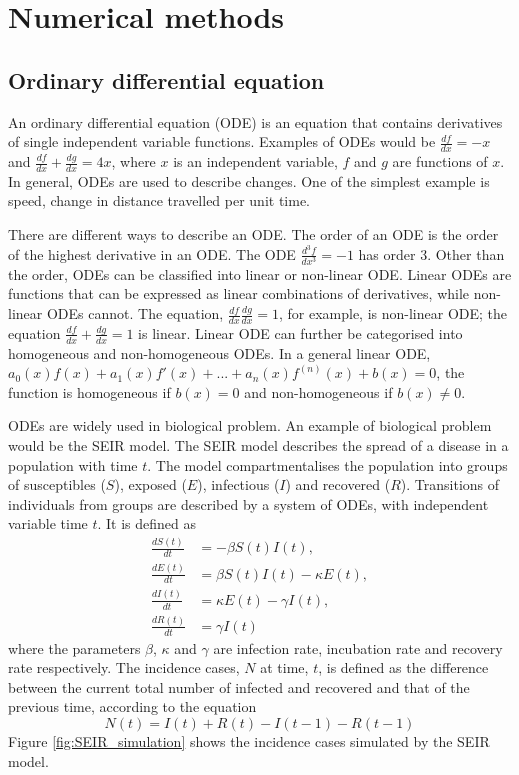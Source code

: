 \chapter{Numerical methods}
\label{chap:numerical-methods}
\section{Ordinary differential equation}
An ordinary differential equation (ODE) is an equation that contains derivatives of single independent variable functions. Examples of ODEs would be $\frac{df}{dx}=-x$ and $\frac{df}{dx} + \frac{dg}{dx} = 4x$, where $x$ is an independent variable, $f$ and $g$ are functions of $x$. In general, ODEs are used to describe changes. One of the simplest example is speed, change in distance travelled per unit time. 

There are different ways to describe an ODE. The order of an ODE is the order of the highest derivative in an ODE. The ODE $\frac{d^3f}{dx^3} = -1$ has order 3. Other than the order, ODEs can be classified into linear or non-linear ODE. Linear ODEs are functions that can be expressed as linear combinations of derivatives, while non-linear ODEs cannot. The equation, $\frac{df}{dx} \frac{dg}{dx} = 1$, for example, is non-linear ODE; the equation $\frac{df}{dx} + \frac{dg}{dx} = 1$ is linear. Linear ODE can further be categorised into homogeneous and non-homogeneous ODEs. In a general linear ODE, $a_0(x)f(x)+a_1(x)f'(x)+...+a_n(x)f^{(n)}(x)+b(x) = 0$, the function is homogeneous if $b(x) = 0$ and non-homogeneous if $b(x) \neq 0$.

ODEs are widely used in biological problem. An example of biological problem would be the SEIR model. The SEIR model describes the spread of a disease in a population with time $t$. The model compartmentalises the population into groups of susceptibles ($S$), exposed ($E$), infectious ($I$) and recovered ($R$). Transitions of individuals from groups are described by a system of ODEs, with independent variable time $t$. It is defined as 
\begin{align}
\label{eqn:SEIR-model}
    \frac{dS(t)}{dt} &= -\beta S(t)I(t),  \\ 
    \frac{dE(t)}{dt} &= \beta S(t)I(t) - \kappa E(t), \\
    \frac{dI(t)}{dt} &= \kappa E(t) - \gamma I(t), \\
    \frac{dR(t)}{dt} &= \gamma I(t) \label{eqn:SEIR-end}
\end{align}
where the parameters $\beta$, $\kappa$ and $\gamma$ are infection rate, incubation rate and recovery rate respectively. The incidence cases, $N$ at time, $t$, is defined as the difference between the current total number of infected and recovered and that of the previous time, according to the equation
\begin{equation}
    N(t) = I(t) + R(t) - I(t-1) - R(t-1)
\end{equation}
Figure \ref{fig:SEIR_simulation} shows the incidence cases simulated by the SEIR model.

